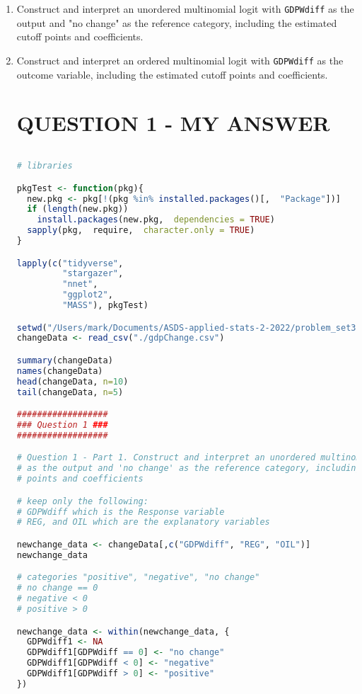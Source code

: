 \documentclass[12pt,letterpaper]{article}
\begin{document}
\begin{enumerate}
	\item Construct and interpret an unordered multinomial logit with \texttt{GDPWdiff} as the output and "no change" as the reference category, including the estimated cutoff points and coefficients.
	\item Construct and interpret an ordered multinomial logit with \texttt{GDPWdiff} as the outcome variable, including the estimated cutoff points and coefficients.
	
	
\section*{QUESTION 1 - MY ANSWER} 


	\begin{lstlisting}[language=R]
	
# libraries

pkgTest <- function(pkg){
  new.pkg <- pkg[!(pkg %in% installed.packages()[,  "Package"])]
  if (length(new.pkg)) 
    install.packages(new.pkg,  dependencies = TRUE)
  sapply(pkg,  require,  character.only = TRUE)
}

lapply(c("tidyverse",
         "stargazer",
         "nnet",
         "ggplot2",
         "MASS"), pkgTest)

setwd("/Users/mark/Documents/ASDS-applied-stats-2-2022/problem_set3")
changeData <- read_csv("./gdpChange.csv")

summary(changeData)
names(changeData)
head(changeData, n=10)
tail(changeData, n=5)

##################
### Question 1 ###
##################

# Question 1 - Part 1. Construct and interpret an unordered multinominal logit with GDPWdiff 
# as the output and 'no change' as the reference category, including the estimated cutoff 
# points and coefficients

# keep only the following:
# GDPWdiff which is the Response variable
# REG, and OIL which are the explanatory variables

newchange_data <- changeData[,c("GDPWdiff", "REG", "OIL")]
newchange_data

# categories "positive", "negative", "no change"
# no change == 0
# negative < 0
# positive > 0

newchange_data <- within(newchange_data, {
  GDPWdiff1 <- NA
  GDPWdiff1[GDPWdiff == 0] <- "no change"
  GDPWdiff1[GDPWdiff < 0] <- "negative"
  GDPWdiff1[GDPWdiff > 0] <- "positive"
})


\end{lstlisting}
\end{enumerate}
\end{document}
